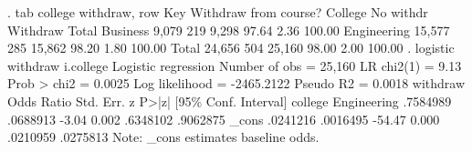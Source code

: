 . tab college withdraw, row
{\smallskip}
{\TLC}
{\VBAR} Key            {\VBAR}
{\LFTT}
{\VBAR}   {}    {\VBAR}
{\VBAR} {} {\VBAR}
{\BLC}
{\smallskip}
            {\VBAR} Withdraw from course?
    College {\VBAR} No withdr   Withdraw {\VBAR}     Total
   Business {\VBAR}     9,079        219 {\VBAR}     9,298 
            {\VBAR}     97.64       2.36 {\VBAR}    100.00 
Engineering {\VBAR}    15,577        285 {\VBAR}    15,862 
            {\VBAR}     98.20       1.80 {\VBAR}    100.00 
      Total {\VBAR}    24,656        504 {\VBAR}    25,160 
            {\VBAR}     98.00       2.00 {\VBAR}    100.00 
{\smallskip}
. logistic withdraw i.college
{\smallskip}
Logistic regression                             Number of obs     =     25,160
                                                LR chi2(1)        =       9.13
                                                Prob > chi2       =     0.0025
Log likelihood = -2465.2122                     Pseudo R2         =     0.0018
{\smallskip}
    withdraw {\VBAR} Odds Ratio   Std. Err.      z    P>|z|     [95\% Conf. Interval]
     college {\VBAR}
Engineering  {\VBAR}   .7584989   .0688913    -3.04   0.002     .6348102    .9062875
       _cons {\VBAR}   .0241216   .0016495   -54.47   0.000     .0210959    .0275813
Note: _cons estimates baseline odds.
{\smallskip}
